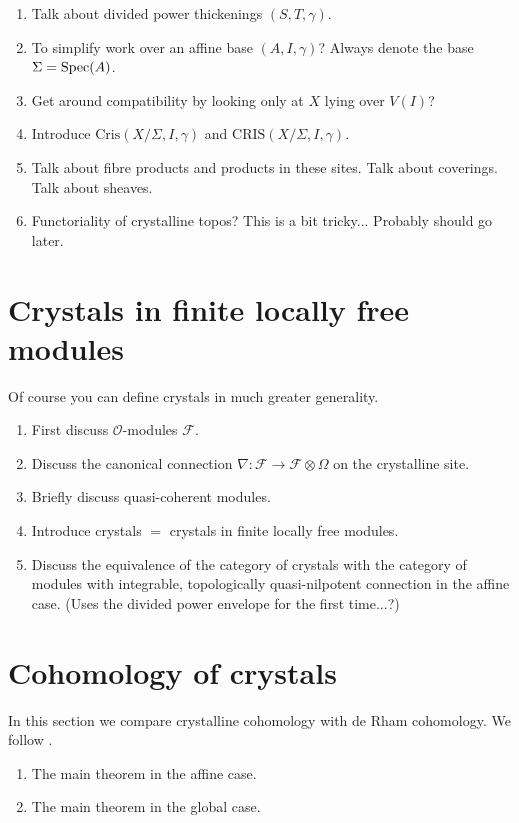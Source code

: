 \begin{enumerate}
\item Talk about divided power thickenings $(S, T, \gamma)$.
\item To simplify work over an affine base $(A, I, \gamma)$?
Always denote the base $\Sigma = \mathop{\rm Spec}(A)$.
\item Get around compatibility by looking only at $X$ lying over
$V(I)$?
\item Introduce $\text{Cris}(X/\Sigma, I, \gamma)$ and
$\text{CRIS}(X/\Sigma, I, \gamma)$.
\item Talk about fibre products and products in these sites.
Talk about coverings. Talk about sheaves.
\item Functoriality of crystalline topos? This is a bit tricky...
Probably should go later.
\end{enumerate}






\section{Crystals in finite locally free modules}
\label{section-crystals}

\noindent
Of course you can define crystals in much greater generality.

\begin{enumerate}
\item First discuss $\mathcal{O}$-modules $\mathcal{F}$.
\item Discuss the canonical connection
$\nabla : \mathcal{F} \to \mathcal{F} \otimes \Omega$
on the crystalline site.
\item Briefly discuss quasi-coherent modules.
\item Introduce crystals $=$ crystals in finite locally free modules.
\item Discuss the equivalence of the category of crystals with the
category of modules with integrable, topologically quasi-nilpotent
connection in the affine case. (Uses the divided power envelope for the
first time...?)
\end{enumerate}






\section{Cohomology of crystals}
\label{section-cohomology}

\noindent
In this section we compare crystalline cohomology with de Rham
cohomology. We follow \cite{Bhatt}.

\begin{enumerate}
\item The main theorem in the affine case.
\item The main theorem in the global case.
\end{enumerate}














